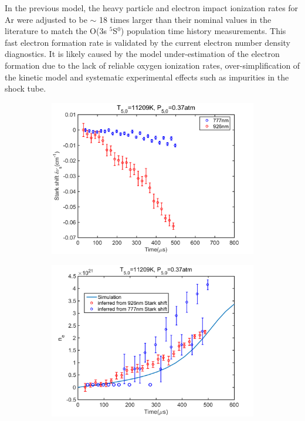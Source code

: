 \documentclass[12pt]{iopart}
\begin{document}
In the previous model\cite{Li2019_modeling}, the heavy particle and electron impact ionization rates for Ar were adjusted to be $\sim$ 18 times larger than their nominal values in the literature to match the O(3s $^5$S$^0$) population time history measurements.  This fast electron formation rate is validated by the current electron number density diagnostics. It is likely caused by the model under-estimation of the electron formation due to the lack of reliable oxygen ionization rates, over-simplification of the kinetic model and systematic experimental effects such as impurities in the shock tube. 

\begin{figure}[h]
  \centering
  \begin{subfigure}[b]{0.4\textwidth}
     \includegraphics[width=\textwidth]{11209K_037atm_Stark_shift.png}
    \caption{\label{fig:stark_shift_777_926} }
    \end{subfigure}
    \begin{subfigure}[b]{0.4\textwidth}
         \includegraphics[width=\textwidth]{11209K_037atm_ne_sim_777_926.png}

\end{subfigure}
\end{figure}
\end{document}
